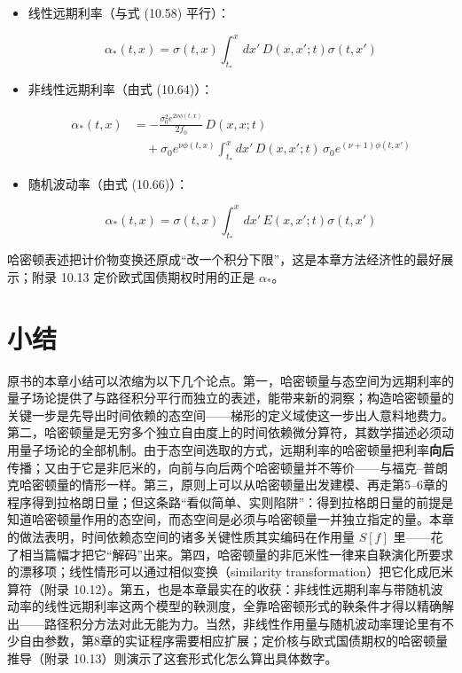 \begin{itemize}
\item 线性远期利率（与式 (10.58) 平行）：

\begin{equation*}
\alpha_*(t,x)=\sigma(t,x)\int_{t_*}^x dx'\,D(x,x';t)\sigma(t,x')
\tag{10.71}
\end{equation*}

\item 非线性远期利率（由式 (10.64)）：

\begin{equation*}
\begin{aligned}
\alpha_*(t,x)&=-\frac{\sigma_0^2e^{2\nu\phi(t,x)}}{2f_0}\,D(x,x;t)\\
&\quad+\sigma_0e^{\nu\phi(t,x)}\int_{t_*}^x dx'\,D(x,x';t)\,\sigma_0e^{(\nu+1)\phi(t,x')}
\end{aligned}
\end{equation*}

\item 随机波动率（由式 (10.66)）：

\begin{equation*}
\alpha_*(t,x)=\sigma(t,x)\int_{t_*}^x dx'\,E(x,x';t)\sigma(t,x')
\end{equation*}

\end{itemize}

哈密顿表述把计价物变换还原成“改一个积分下限”，这是本章方法经济性的最好展示；附录 10.13 定价欧式国债期权时用的正是 $\alpha_*$。

\section{小结}

原书的本章小结可以浓缩为以下几个论点。第一，哈密顿量与态空间为远期利率的量子场论提供了与路径积分平行而独立的表述，能带来新的洞察；构造哈密顿量的关键一步是先导出时间依赖的态空间——梯形的定义域使这一步出人意料地费力。第二，哈密顿量是无穷多个独立自由度上的时间依赖微分算符，其数学描述必须动用量子场论的全部机制。由于态空间选取的方式，远期利率的哈密顿量把利率\textbf{向后}传播；又由于它是非厄米的，向前与向后两个哈密顿量并不等价——与福克–普朗克哈密顿量的情形一样。第三，原则上可以从哈密顿量出发建模、再走第5--6章的程序得到拉格朗日量；但这条路“看似简单、实则陷阱”：得到拉格朗日量的前提是知道哈密顿量作用的态空间，而态空间是必须与哈密顿量一并独立指定的量。本章的做法表明，时间依赖态空间的诸多关键性质其实编码在作用量 $S[f]$ 里——花了相当篇幅才把它“解码”出来。第四，哈密顿量的非厄米性一律来自鞅演化所要求的漂移项；线性情形可以通过相似变换（similarity transformation）把它化成厄米算符（附录 10.12）。第五，也是本章最实在的收获：非线性远期利率与带随机波动率的线性远期利率这两个模型的鞅测度，全靠哈密顿形式的鞅条件才得以精确解出——路径积分方法对此无能为力。当然，非线性作用量与随机波动率理论里有不少自由参数，第8章的实证程序需要相应扩展；定价核与欧式国债期权的哈密顿量推导（附录 10.13）则演示了这套形式化怎么算出具体数字。

